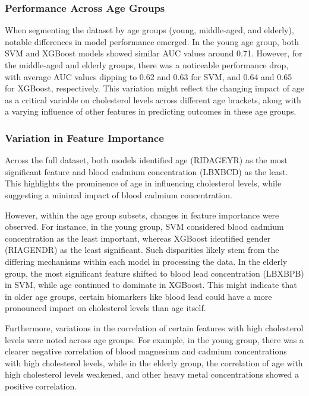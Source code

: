 \documentclass{article}
\begin{document}
\subsubsection{Performance Across Age Groups}

When segmenting the dataset by age groups (young, middle-aged, and elderly), notable differences in model performance emerged. In the young age group, both SVM and XGBoost models showed similar AUC values around 0.71. However, for the middle-aged and elderly groups, there was a noticeable performance drop, with average AUC values dipping to 0.62 and 0.63 for SVM, and 0.64 and 0.65 for XGBoost, respectively. This variation might reflect the changing impact of age as a critical variable on cholesterol levels across different age brackets, along with a varying influence of other features in predicting outcomes in these age groups.

\subsubsection{Variation in Feature Importance}

Across the full dataset, both models identified age (RIDAGEYR) as the most significant feature and blood cadmium concentration (LBXBCD) as the least. This highlights the prominence of age in influencing cholesterol levels, while suggesting a minimal impact of blood cadmium concentration.

However, within the age group subsets, changes in feature importance were observed. For instance, in the young group, SVM considered blood cadmium concentration as the least important, whereas XGBoost identified gender (RIAGENDR) as the least significant. Such disparities likely stem from the differing mechanisms within each model in processing the data. In the elderly group, the most significant feature shifted to blood lead concentration (LBXBPB) in SVM, while age continued to dominate in XGBoost. This might indicate that in older age groups, certain biomarkers like blood lead could have a more pronounced impact on cholesterol levels than age itself.

Furthermore, variations in the correlation of certain features with high cholesterol levels were noted across age groups. For example, in the young group, there was a clearer negative correlation of blood magnesium and cadmium concentrations with high cholesterol levels, while in the elderly group, the correlation of age with high cholesterol levels weakened, and other heavy metal concentrations showed a positive correlation.
\end{document}
